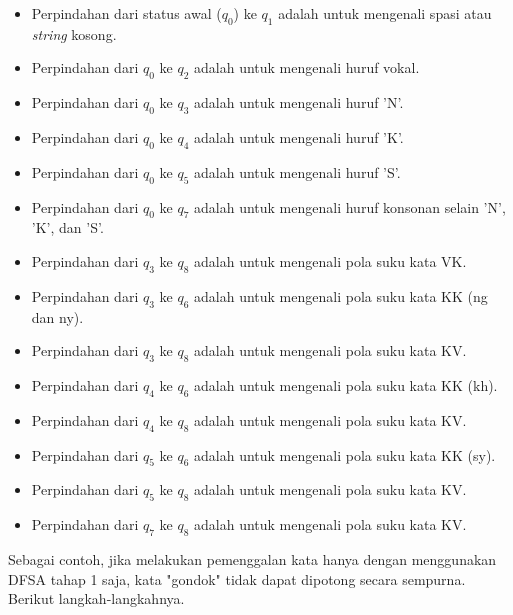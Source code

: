 \begin{itemize}
	\item Perpindahan dari status awal (\textit{$q_0$}) ke \textit{$q_1$} adalah untuk mengenali spasi atau \textit{string} kosong.
	\item Perpindahan dari \textit{$q_0$} ke \textit{$q_2$} adalah untuk mengenali huruf vokal.
	\item Perpindahan dari \textit{$q_0$} ke \textit{$q_3$} adalah untuk mengenali huruf 'N'.
	\item Perpindahan dari \textit{$q_0$} ke \textit{$q_4$} adalah untuk mengenali huruf 'K'.
	\item Perpindahan dari \textit{$q_0$} ke \textit{$q_5$} adalah untuk mengenali huruf 'S'.
	\item Perpindahan dari \textit{$q_0$} ke \textit{$q_7$} adalah untuk mengenali huruf konsonan selain 'N', 'K', dan 'S'.
	\item Perpindahan dari \textit{$q_3$} ke \textit{$q_8$} adalah untuk mengenali pola suku kata VK.
	\item Perpindahan dari \textit{$q_3$} ke \textit{$q_6$} adalah untuk mengenali pola suku kata KK (ng dan ny).
	\item Perpindahan dari \textit{$q_3$} ke \textit{$q_8$} adalah untuk mengenali pola suku kata KV.
	\item Perpindahan dari \textit{$q_4$} ke \textit{$q_6$} adalah untuk mengenali pola suku kata KK (kh).
	\item Perpindahan dari \textit{$q_4$} ke \textit{$q_8$} adalah untuk mengenali pola suku kata KV.
	\item Perpindahan dari \textit{$q_5$} ke \textit{$q_6$} adalah untuk mengenali pola suku kata KK (sy).
	\item Perpindahan dari \textit{$q_5$} ke \textit{$q_8$} adalah untuk mengenali pola suku kata KV.
	\item Perpindahan dari \textit{$q_7$} ke \textit{$q_8$} adalah untuk mengenali pola suku kata KV.
\end{itemize}

Sebagai contoh, jika melakukan pemenggalan kata hanya dengan menggunakan DFSA tahap 1 saja, kata "gondok" tidak dapat dipotong secara sempurna. Berikut langkah-langkahnya.

